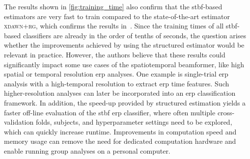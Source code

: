 	The results shown in \cref{fig:training_time} also confirm that the
	\ac{stbf}-based estimators are very fast to train compared to the
	state-of-the-art estimator \textsc{xdawn+rg}, which confirms the results in~\cite{Wittevrongel2016}.
	Since the training times of all \ac{stbf}-based classifiers are already in
	the order of tenths of seconds, the question arises whether the
	improvements achieved by using the structured estimator would be relevant in
	practice.
	However, the authors believe that these results could significantly impact some
	use cases of the spatiotemporal beamformer, like high spatial or temporal resolution \ac{erp} analyses.
	One example is single-trial \ac{erp} analysis with a high-temporal
	resolution to extract \ac{erp} time features.
	Such higher-resolution analyses can later be incorporated into an \ac{erp}
	classification framework.
	In addition, the speed-up provided by structured estimation yields a faster
	off-line evaluation of the \ac{stbf} \ac{erp} classifier, where often multiple cross-validation folds, subjects, and hyperparameter settings need to be explored, which can quickly increase runtime.
	Improvements in computation speed and memory usage can remove the need for dedicated computation hardware and enable running group analyses on a personal computer.

